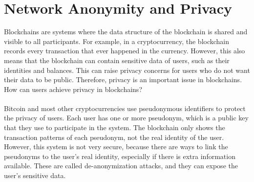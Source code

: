 \section{Network Anonymity and Privacy}
Blockchains are systems where the data structure of the blockchain is shared and visible to all participants. For example, in a cryptocurrency, the blockchain records every transaction that ever happened in the currency. However, this also means that the blockchain can contain sensitive data of users, such as their identities and balances. This can raise privacy concerns for users who do not want their data to be public. Therefore, privacy is an important issue in blockchains. How can users achieve privacy in blockchains?\\\\
Bitcoin and most other cryptocurrencies use pseudonymous identifiers to protect the privacy of users. Each user has one or more pseudonym, which is a public key that they use to participate in the system. The blockchain only shows the transaction patterns of each pseudonym, not the real identity of the user. However, this system is not very secure, because there are ways to link the pseudonyms to the user’s real identity, especially if there is extra information available. These are called de-anonymization attacks, and they can expose the user’s sensitive data.

